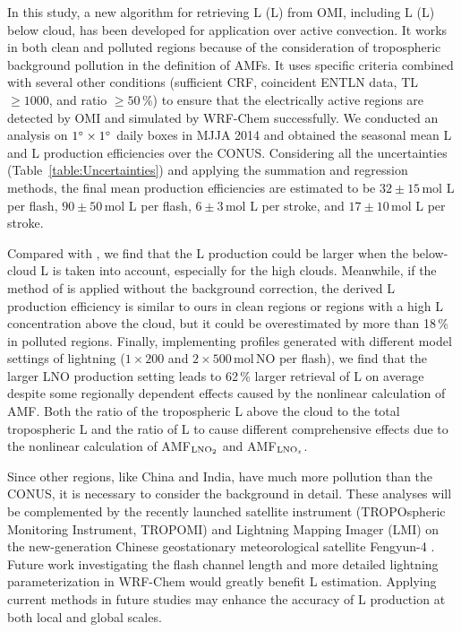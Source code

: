 \documentclass[amt]{copernicus}
\begin{document}
In this study, a new algorithm for retrieving L (L) from OMI, including L (L) below cloud, has been developed for application over active convection.
It works in both clean and polluted regions because of the consideration of tropospheric background pollution in the definition of AMFs.
It uses specific criteria combined with several other conditions (sufficient CRF, coincident ENTLN data, TL~$\geq 1000$, and ratio $\geq 50$\,{\%}) to ensure that the electrically active regions are detected by OMI and simulated by WRF-Chem successfully.
We conducted an analysis on $1{^{\circ}} \times 1{^{\circ}}$ daily boxes in MJJA 2014 and obtained the seasonal mean L and L production efficiencies over the CONUS.
Considering all the uncertainties (Table~\ref{table:Uncertainties}) and applying the summation and regression methods, the final mean production efficiencies are estimated to be $32 \pm 15$\,mol L per flash, $90 \pm 50$\,mol L per flash, $6 \pm 3$\,mol L per stroke, and $17 \pm 10$\,mol L per stroke.

Compared with \citet{Lapierre.2020}, we find that the L production could be larger when the below-cloud L is taken into account, especially for the high clouds.
Meanwhile, if the method of \citet{Pickering.2016} is applied without the background  correction, the derived L production efficiency is similar to ours in clean regions or regions with a high L concentration above the cloud, but it could be overestimated by more than 18\,{\%} in polluted regions.
Finally, implementing profiles generated with different model settings of lightning ($1\times200$ and $2\times500$\,mol\,NO per flash), we find that the larger LNO production setting leads to 62\,{\%} larger retrieval of L on average despite some regionally dependent effects caused by the nonlinear calculation of AMF.
Both the ratio of the tropospheric L above the cloud to the total tropospheric L and the ratio of L to  cause different comprehensive effects due to the nonlinear calculation of AMF$_{\chem{LNO_2}}$ and AMF$_{\chem{LNO_\mathit{x}}}$.


\hack{\newpage}
Since other regions, like China and India, have much more  pollution than the CONUS, it is necessary to consider the background  in detail.
These analyses will be complemented by the recently launched satellite instrument (TROPOspheric Monitoring Instrument, TROPOMI) \citep{Veefkind.2012,Boersma.2018,Griffin.2019} and Lightning Mapping Imager (LMI) on the new-generation Chinese geostationary meteorological satellite Fengyun-4 \citep{Min.2017,Yang.2017,Zhang.2019}.
Future work investigating the flash channel length and more detailed lightning parameterization in WRF-Chem would greatly benefit L estimation.
Applying current methods in future studies may enhance the accuracy of L production at both local and global scales.
\end{document}
